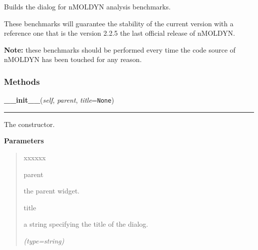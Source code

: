 Builds the dialog for nMOLDYN analysis benchmarks.

These benchmarks will guarantee the stability of the current version with a
reference one that is the version 2.2.5 the last official release of 
nMOLDYN.

\textbf{Note:} these benchmarks should be performed every time the code source of nMOLDYN 
has been touched for any reason.





  \subsubsection{Methods}

    \label{nMOLDYN:GUI:AnalysisBenchmarkDialog:AnalysisBenchmarkDialog:__init__}

    \vspace{0.5ex}

\hspace{.8\funcindent}\begin{boxedminipage}{\funcwidth}

    \raggedright \textbf{\_\_init\_\_}(\textit{self}, \textit{parent}, \textit{title}={\tt None})

    \vspace{-1.5ex}

    \rule{\textwidth}{0.5\fboxrule}
\setlength{\parskip}{2ex}
    The constructor.

\setlength{\parskip}{1ex}
      \textbf{Parameters}
      \vspace{-1ex}

      \begin{quote}
        \begin{Ventry}{xxxxxx}

          \item[parent]

          the parent widget.

          \item[title]

          a string specifying the title of the dialog.

            {\it (type=string)}

        \end{Ventry}

      \end{quote}

    \end{boxedminipage}

